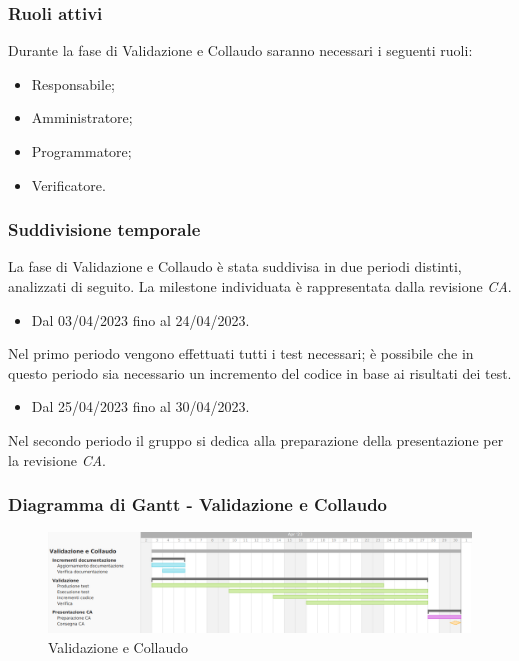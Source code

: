 \subsubsection{Ruoli attivi}
Durante la fase di Validazione e Collaudo saranno necessari i seguenti ruoli:
\begin{itemize}
	\item Responsabile;
    \item Amministratore;
    \item Programmatore;
    \item Verificatore.
\end{itemize}

\subsubsection{Suddivisione temporale}
La fase di Validazione e Collaudo è stata suddivisa in due periodi distinti, analizzati di seguito. La milestone individuata è rappresentata dalla revisione \textit{CA}.

\begin{itemize}
    \item Dal 03/04/2023 fino al 24/04/2023.
\end{itemize}
Nel primo periodo vengono effettuati tutti i test necessari; è possibile che in questo periodo sia necessario un incremento del codice in base ai risultati dei test.

\begin{itemize}
    \item Dal 25/04/2023 fino al 30/04/2023.
\end{itemize}
Nel secondo periodo il gruppo si dedica alla preparazione della presentazione per la revisione \textit{CA}.

\subsubsection{Diagramma di Gantt - Validazione e Collaudo}

\begin{figure}[H]
\centering
\includegraphics[width=\textwidth]{img/4_collaudo.png}
\caption{Validazione e Collaudo}
\end{figure}

